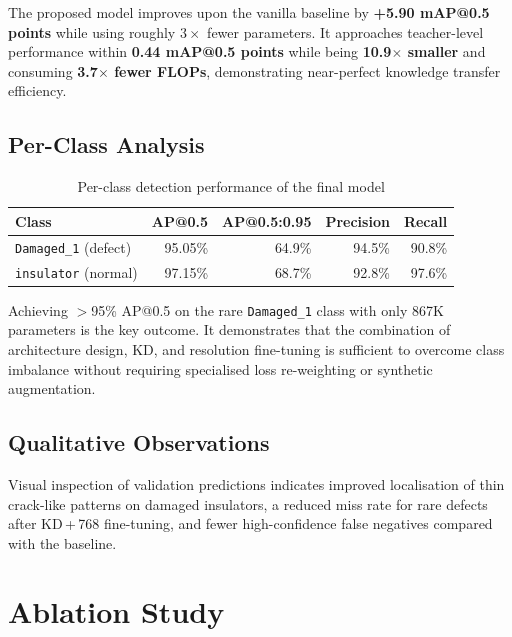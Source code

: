 \documentclass[11pt,a4paper]{article}
\begin{document}
The proposed model improves upon the vanilla baseline by \textbf{+5.90 mAP@0.5 points}
while using roughly $3\times$ fewer parameters. It approaches teacher-level performance
within \textbf{0.44 mAP@0.5 points} while being \textbf{10.9$\times$ smaller} and
consuming \textbf{3.7$\times$ fewer FLOPs}, demonstrating near-perfect knowledge transfer
efficiency.

\subsection{Per-Class Analysis}

\begin{table}[H]
\centering
\caption{Per-class detection performance of the final model}
\label{tab:per_class}
\begin{tabular}{lrrrr}
\toprule
\textbf{Class}               & \textbf{AP@0.5} & \textbf{AP@0.5:0.95} &
\textbf{Precision} & \textbf{Recall} \\
\midrule
\texttt{Damaged\_1} (defect) & 95.05\% & 64.9\% & 94.5\% & 90.8\% \\
\texttt{insulator} (normal)  & 97.15\% & 68.7\% & 92.8\% & 97.6\% \\
\bottomrule
\end{tabular}
\end{table}

Achieving $>$95\% AP@0.5 on the rare \texttt{Damaged\_1} class with only 867K parameters
is the key outcome. It demonstrates that the combination of architecture design, KD, and
resolution fine-tuning is sufficient to overcome class imbalance without requiring
specialised loss re-weighting or synthetic augmentation.

\subsection{Qualitative Observations}

Visual inspection of validation predictions indicates improved localisation of thin
crack-like patterns on damaged insulators, a reduced miss rate for rare defects after
KD\,+\,768 fine-tuning, and fewer high-confidence false negatives compared with the
baseline.

\section{Ablation Study}
\label{sec:ablation}
\end{document}
